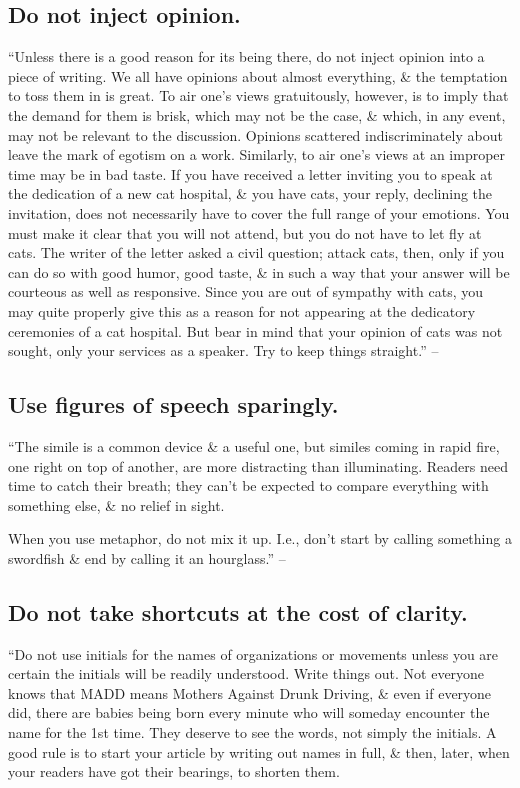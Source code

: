 \documentclass{article}
\numberwithin{equation}{section}
\begin{document}
\subsection{Do not inject opinion.}
``Unless there is a good reason for its being there, do not inject opinion into a piece of writing. We all have opinions about almost everything, \& the temptation to toss them in is great. To air one's views gratuitously, however, is to imply that the demand for them is brisk, which may not be the case, \& which, in any event, may not be relevant to the discussion. Opinions scattered indiscriminately about leave the mark of egotism on a work. Similarly, to air one's views at an improper time may be in bad taste. If you have received a letter inviting you to speak at the dedication of a new cat hospital, \& you have cats, your reply, declining the invitation, does not necessarily have to cover the full range of your emotions. You must make it clear that you will not attend, but you do not have to let fly at cats. The writer of the letter asked a civil question; attack cats, then, only if you can do so with good humor, good taste, \& in such a way that your answer will be courteous as well as responsive. Since you are out of sympathy with cats, you may quite properly give this as a reason for not appearing at the dedicatory ceremonies of a cat hospital. But bear in mind that your opinion of cats was not sought, only your services as a speaker. Try to keep things straight.'' -- \cite[p. 96]{Strunk_White2019}


\subsection{Use figures of speech sparingly.}
``The simile is a common device \& a useful one, but similes coming in rapid fire, one right on top of another, are more distracting than illuminating. Readers need time to catch their breath; they can't be expected to compare everything with something else, \& no relief in sight.

When you use metaphor, do not mix it up. I.e., don't start by calling something a swordfish \& end by calling it an hourglass.'' -- \cite[p. 97]{Strunk_White2019}


\subsection{Do not take shortcuts at the cost of clarity.}
``Do not use initials for the names of organizations or movements unless you are certain the initials will be readily understood. Write things out. Not everyone knows that MADD means Mothers Against Drunk Driving, \& even if everyone did, there are babies being born every minute who will someday encounter the name for the 1st time. They deserve to see the words, not simply the initials. A good rule is to start your article by writing out names in full, \& then, later, when your readers have got their bearings, to shorten them.
\end{document}

